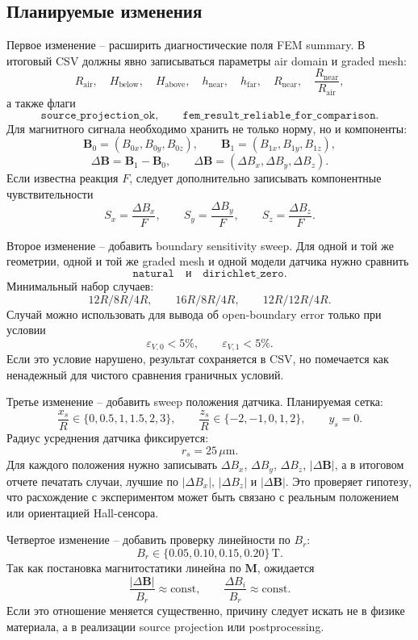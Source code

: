 \documentclass[12pt,a4paper]{article}
\begin{document}
\subsection*{Планируемые изменения}

Первое изменение -- расширить диагностические поля FEM summary. В итоговый
CSV должны явно записываться параметры air domain и graded mesh:
\[
    R_{\mathrm{air}},\quad
    H_{\mathrm{below}},\quad
    H_{\mathrm{above}},\quad
    h_{\mathrm{near}},\quad
    h_{\mathrm{far}},\quad
    R_{\mathrm{near}},\quad
    \frac{R_{\mathrm{near}}}{R_{\mathrm{air}}},
\]
а также флаги
\[
    \texttt{source\_projection\_ok},\qquad
    \texttt{fem\_result\_reliable\_for\_comparison}.
\]
Для магнитного сигнала необходимо хранить не только норму, но и компоненты:
\[
    \mathbf B_0=(B_{0x},B_{0y},B_{0z}),\qquad
    \mathbf B_1=(B_{1x},B_{1y},B_{1z}),
\]
\[
    \Delta \mathbf B=\mathbf B_1-\mathbf B_0,
    \qquad
    \Delta \mathbf B=(\Delta B_x,\Delta B_y,\Delta B_z).
\]
Если известна реакция \(F\), следует дополнительно записывать компонентные
чувствительности
\[
    S_x=\frac{\Delta B_x}{F},\qquad
    S_y=\frac{\Delta B_y}{F},\qquad
    S_z=\frac{\Delta B_z}{F}.
\]

Второе изменение -- добавить boundary sensitivity sweep. Для одной и той же
геометрии, одной и той же graded mesh и одной модели датчика нужно сравнить
\[
    \texttt{natural}
    \quad \text{и} \quad
    \texttt{dirichlet\_zero}.
\]
Минимальный набор случаев:
\[
    12R/8R/4R,\qquad
    16R/8R/4R,\qquad
    12R/12R/4R.
\]
Случай можно использовать для вывода об open-boundary error только при условии
\[
    \varepsilon_{V,0}<5\%,
    \qquad
    \varepsilon_{V,1}<5\%.
\]
Если это условие нарушено, результат сохраняется в CSV, но помечается как
ненадежный для чистого сравнения граничных условий.

Третье изменение -- добавить sweep положения датчика. Планируемая сетка:
\[
    \frac{x_s}{R}\in\{0,0.5,1,1.5,2,3\},
    \qquad
    \frac{z_s}{R}\in\{-2,-1,0,1,2\},
    \qquad
    y_s=0.
\]
Радиус усреднения датчика фиксируется:
\[
    r_s=25\,\mu\mathrm{m}.
\]
Для каждого положения нужно записывать \(\Delta B_x\), \(\Delta B_y\),
\(\Delta B_z\), \(|\Delta\mathbf B|\), а в итоговом отчете печатать случаи,
лучшие по \(|\Delta B_x|\), \(|\Delta B_z|\) и \(|\Delta\mathbf B|\). Это
проверяет гипотезу, что расхождение с экспериментом может быть связано с
реальным положением или ориентацией Hall-сенсора.

Четвертое изменение -- добавить проверку линейности по \(B_r\):
\[
    B_r\in\{0.05,0.10,0.15,0.20\}\,\mathrm{T}.
\]
Так как постановка магнитостатики линейна по \(\mathbf M\), ожидается
\[
    \frac{|\Delta\mathbf B|}{B_r}\approx \mathrm{const},
    \qquad
    \frac{\Delta B_i}{B_r}\approx \mathrm{const}.
\]
Если это отношение меняется существенно, причину следует искать не в физике
материала, а в реализации source projection или postprocessing.
\end{document}
